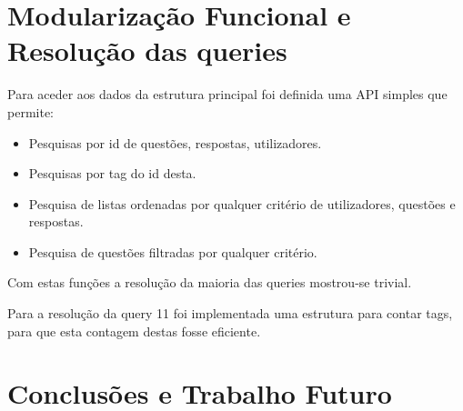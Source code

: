 \documentclass[10pt,a4paper]{report}
\begin{document}
\chapter{Modularização Funcional e Resolução das queries}
    Para aceder aos dados da estrutura principal foi definida uma API
    simples que permite:
    \begin{itemize}
        \item Pesquisas por id de questões, respostas, utilizadores.
        \item Pesquisas por tag do id desta.
        \item Pesquisa de listas ordenadas por qualquer critério de utilizadores,
                questões e respostas.
        \item Pesquisa de questões filtradas por qualquer critério.
    \end{itemize}

    Com estas funções a resolução da maioria das queries mostrou-se
    trivial.

    Para a resolução da query 11 foi implementada uma estrutura para contar tags,
    para que esta contagem destas fosse eficiente.
\chapter{Conclusões e Trabalho Futuro}
\end{document}
